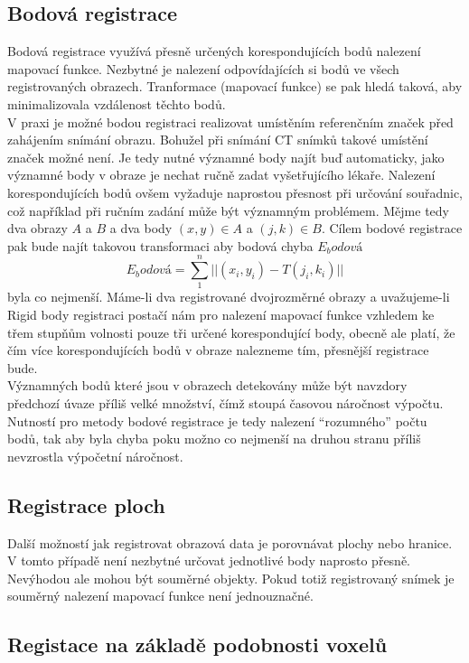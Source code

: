 \documentclass{thesis}%
\begin{document}
\subsection{Bodová registrace}
Bodová registrace využívá přesně určených korespondujících bodů nalezení mapovací funkce. Nezbytné je nalezení odpovídajících si bodů ve všech registrovaných obrazech. Tranformace (mapovací funkce) se pak hledá taková, aby minimalizovala vzdálenost těchto bodů.\\
V praxi je možné bodou registraci realizovat umístěním referenčním značek před zahájením snímání obrazu. Bohužel při snímání CT snímků takové umístění značek možné není. Je tedy nutné významné body najít buď automaticky, jako významné body v obraze je nechat ručně zadat vyšetřujícího lékaře. Nalezení korespondujících bodů ovšem vyžaduje naprostou přesnost při určování souřadnic, což například při ručním zadání může být významným problémem. Mějme tedy dva obrazy $A$ a $B$ a dva body $(x,y) \in A$ a $(j,k)\in B$. Cílem bodové registrace pak bude najít takovou transformaci aby bodová chyba $E_bodová$
\begin{equation}
E_bodová = \sum\limits_{1}^n ||(x_i,y_i)-T(j_i,k_i)||
\end{equation}
byla co nejmenší. Máme-li dva registrované dvojrozměrné obrazy a uvažujeme-li Rigid body registraci postačí nám pro nalezení mapovací funkce vzhledem ke třem stupňům volnosti pouze tři určené korespondující body, obecně ale platí, že čím více korespondujících bodů v obraze nalezneme tím, přesnější registrace bude.\\
Významných bodů které jsou v obrazech detekovány může být navzdory předchozí úvaze příliš velké množství, čímž stoupá časovou náročnost výpočtu. Nutností pro metody bodové registrace je tedy nalezení ``rozumného'' počtu bodů, tak aby byla chyba poku možno co nejmenší na druhou stranu příliš nevzrostla výpočetní náročnost.
\subsection{Registrace ploch}
Další možností jak registrovat obrazová data je porovnávat plochy nebo hranice. V tomto případě není nezbytné určovat jednotlivé body naprosto přesně. Nevýhodou ale mohou být souměrné objekty. Pokud totiž registrovaný snímek je souměrný nalezení mapovací funkce není jednouznačné.
\subsection{Registace na základě podobnosti voxelů}
\end{document}

